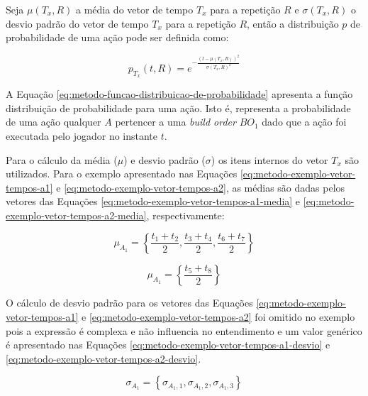 Seja $\mu(T_x, R)$ a média do vetor de tempo $T_x$ para a repetição $R$ e $\sigma(T_x, R)$ o desvio padrão do vetor de tempo $T_x$ para a repetição $R$, então a distribuição $p$ de probabilidade de uma ação pode ser definida como:

\begin{equation}
	p_{T_x}(t, R) = e^{-\frac{(t-\mu(T_x, R))^2}{{\sigma(T_x, R)}^2}}
	\label{eq:metodo-funcao-distribuicao-de-probabilidade}
\end{equation}

A Equação \ref{eq:metodo-funcao-distribuicao-de-probabilidade} apresenta a função distribuição de probabilidade para uma ação. Isto é, representa a probabilidade de uma ação qualquer $A$ pertencer a uma \textit{build order} $BO_1$ dado que a ação foi executada pelo jogador no instante $t$.


Para o cálculo da média ($\mu$) e desvio padrão ($\sigma$) os itens internos do vetor $T_x$ são utilizados. Para o exemplo apresentado nas Equações \ref{eq:metodo-exemplo-vetor-tempos-a1} e \ref{eq:metodo-exemplo-vetor-tempos-a2}, as médias são dadas pelos vetores das Equações \ref{eq:metodo-exemplo-vetor-tempos-a1-media} e \ref{eq:metodo-exemplo-vetor-tempos-a2-media}, respectivamente:

\begin{equation}
    \mu_{A_1} = \left\{
		\frac{t_1 + t_2}{2}, 
		\frac{t_3 + t_4}{2}, 		
		\frac{t_6 + t_7}{2}
	\right\}
	\label{eq:metodo-exemplo-vetor-tempos-a1-media}
\end{equation}

\begin{equation}
    \mu_{A_1} = \left\{
		\frac{t_5 + t_8}{2}
	\right\}
	\label{eq:metodo-exemplo-vetor-tempos-a2-media}
\end{equation}

O cálculo de desvio padrão para os vetores das Equações \ref{eq:metodo-exemplo-vetor-tempos-a1} e \ref{eq:metodo-exemplo-vetor-tempos-a2} foi omitido no exemplo pois a expressão é complexa e não influencia no entendimento e um valor genérico é apresentado nas Equações \ref{eq:metodo-exemplo-vetor-tempos-a1-desvio} e \ref{eq:metodo-exemplo-vetor-tempos-a2-desvio}.

\begin{equation}
    \sigma_{A_1} = \left\{
		\sigma_{{A_1},1}, 
		\sigma_{{A_1},2}, 	
		\sigma_{{A_1},3}
	\right\}
	\label{eq:metodo-exemplo-vetor-tempos-a1-desvio}
\end{equation}

